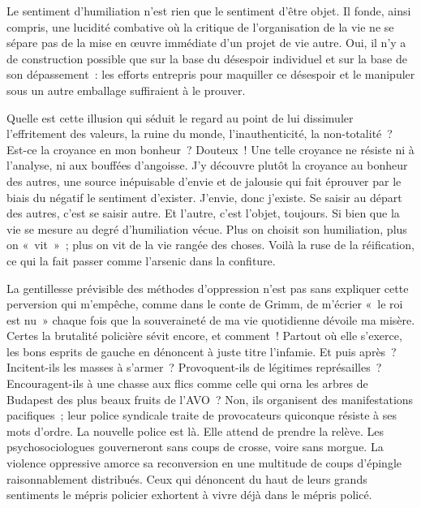 \documentclass[french,twoside]{book} %
\begin{document}
\noindent Le sentiment d’humiliation n’est rien que le sentiment d’être objet. Il fonde, ainsi compris, une lucidité combative où la critique de l’organisation de la vie ne se sépare pas de la mise en œuvre immédiate d’un projet de vie autre. Oui, il n’y a de construction possible que sur la base du désespoir individuel et sur la base de son dépassement : les efforts entrepris pour maquiller ce désespoir et le manipuler sous un autre emballage suffiraient à le prouver.\par
Quelle est cette illusion qui séduit le regard au point de lui dissimuler l’effritement des valeurs, la ruine du monde, l’inauthenticité, la non-totalité ? Est-ce la croyance en mon bonheur ? Douteux ! Une telle croyance ne résiste ni à l’analyse, ni aux bouffées d’angoisse. J’y découvre plutôt la croyance au bonheur des autres, une source inépuisable d’envie et de jalousie qui fait éprouver par le biais du négatif le sentiment d’exister. J’envie, donc j’existe. Se saisir au départ des autres, c’est se saisir autre. Et l’autre, c’est l’objet, toujours. Si bien que la vie se mesure au degré d’humiliation vécue. Plus on choisit son humiliation, plus on « vit » ; plus on vit de la vie rangée des choses. Voilà la ruse de la réification, ce qui la fait passer comme l’arsenic dans la confiture.\par
La gentillesse prévisible des méthodes d’oppression n’est pas sans expliquer cette perversion qui m’empêche, comme dans le conte de Grimm, de m’écrier « le roi est nu » chaque fois que la souveraineté de ma vie quotidienne dévoile ma misère. Certes la brutalité policière sévit encore, et comment ! Partout où elle s’exerce, les bons esprits de gauche en dénoncent à juste titre l’infamie. Et puis après ? Incitent-ils les masses à s’armer ? Provoquent-ils de légitimes représailles ? Encouragent-ils à une chasse aux flics comme celle qui orna les arbres de Budapest des plus beaux fruits de l’AVO ? Non, ils organisent des manifestations pacifiques ; leur police syndicale traite de provocateurs quiconque résiste à ses mots d’ordre. La nouvelle police est là. Elle attend de prendre la relève. Les psychosociologues gouverneront sans coups de crosse, voire sans morgue. La violence oppressive amorce sa reconversion en une multitude de coups d’épingle raisonnablement distribués. Ceux qui dénoncent du haut de leurs grands sentiments le mépris policier exhortent à vivre déjà dans le mépris policé.\par
\end{document}
